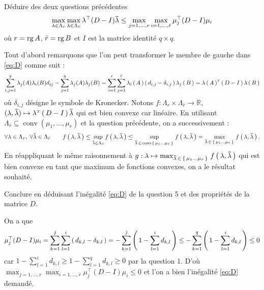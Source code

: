 \begin{qst}

 Déduire des deux questions précédentes
 $$
  \max _ { \lambda \in \Lambda _ { r } } \max _ { \lambda \in \Lambda _ {
    \bar{r} } } \lambda ^ { \top } ( D - I ) \mathbf{\mathbf{\bar{\text{$\lambda$}}}} \leq \max _ { j = 1 , \ldots ,
   r } \max _ { i = 1 , \ldots , \bar{r} } \mu _ { j } ^ { \top } ( D - I )
  \mu _ { i }
 $$
 où $r = \operatorname{rg}{A}$, $\bar{r} = \operatorname{rg}{B}$ et $I$ est la matrice identité $q\times q$.
\end{qst}

\begin{rep}
 Tout d'abord remarquons que l'on peut transformer le membre de gauche dans
 \eqref{eq:D} comme suit :
 $$\sum _ { i , j = 1 } ^ { q } \lambda _ { j } ( A ) \lambda _ { i } ( B )
  d _ { i j } - \sum _ { j = 1 } ^ { q } \lambda _ { j } ( A ) \lambda _ { j } ( B )
  = \sum _ { i = 1 } ^ { r } \sum _ { j = 1 } ^ { \bar{r} } \lambda_i\left( \, A \, \right) \left( \, d_{i,j}-\delta_{i,j} \, \right) \lambda_j\left( \, B \, \right) = \lambda\left( \, A \, \right)^{\scriptscriptstyle T} \left( \, D-I \, \right) \lambda \left( \, B \, \right)$$
 où $\delta_{i,j}$ désigne le symbole de Kronecker. Notons $f : \Lambda_r\times \Lambda_{\bar{r}} \rightarrow \mathbb { R }$, $(\lambda, \mathbf{\mathbf{\bar{\text{$\lambda$}}}})
  \mapsto \lambda^{\scriptscriptstyle T} \left( \, D-I \, \right) \mathbf{\mathbf{\bar{\text{$\lambda$}}}}$ qui est bien convexe car linéaire.
 En utilisant $ \displaystyle \Lambda _ { \bar{r} } \subseteq \operatorname { conv }
  \left( \mu _ { 1 } , \ldots , \mu _ { \bar{r} } \right)$ et la question précédente, on a successivement :
 $$\forall \lambda \in \Lambda_r,\; \forall \mathbf{\mathbf{\bar{\text{$\lambda$}}}} \in \Lambda_{\bar{r}} \qquad f\left( \, \lambda, \mathbf{\mathbf{\bar{\text{$\lambda$}}}} \, \right) \leq
  \sup_{\mathbf{\mathbf{\bar{\text{$\lambda$}}}} \in \Lambda_{\bar{r}}} f\left( \, \lambda, \mathbf{\mathbf{\bar{\text{$\lambda$}}}} \, \right) \leq \sup_{\mathbf{\mathbf{\bar{\text{$\lambda$}}}} \, \in \, \operatorname{conv} \left \{ \, \mu_1 \ldots \mu_{\bar{r}} \, \right \}\, } f\left( \, \lambda, \mathbf{\mathbf{\bar{\text{$\lambda$}}}} \, \right) = \max_{\mathbf{\mathbf{\bar{\text{$\lambda$}}}} \,\in \,\left \{ \, \mu_1 \ldots \mu_{\bar{r}} \, \right \}\,} f\left( \, \lambda, \mathbf{\mathbf{\bar{\text{$\lambda$}}}} \, \right)
  .$$
 En réappliquant le même raisonnement à $g: \lambda \mapsto \max_{\mathbf{\mathbf{\bar{\text{$\lambda$}}}} \,\in \,\left \{ \, \mu_1 \ldots \mu_{\bar{r}} \, \right \}\,} f\left( \, \lambda, \mathbf{\mathbf{\bar{\text{$\lambda$}}}} \, \right)$ qui est bien convexe
 en tant que maximum de fonctions convexes, on a le résultat souhaité.
\end{rep}

\begin{qst}

 Conclure en déduisant l'inégalité \eqref{eq:D} de la question 5 et des propriétés
 de la matrice $D$.
\end{qst}

\begin{rep}

 On a que
 $$\mu _ {j} ^ {\top} ( D - I )\mu _ {i} = \sum_{k = 1}^j \sum_{l=1}^i \left( \, d_{k,l} - \delta_{k,l} \, \right) = -\sum_{k = 1}^j \left( \, 1-\sum_{l=1}^i d_{k,l} \, \right)
  \leq -\sum_{k = 1}^q \left( \, 1-\sum_{l=1}^i d_{k,l} \, \right) \leq 0$$
 car $1 - \sum_{l=1}^i d_{k,l} \geq 1 - \sum_{l=1}^q d_{k,l} \geq 0$ par la question 1. D'où
 $\displaystyle \max _ { j = 1 , \ldots ,
   r } \max _ { i = 1 , \ldots , \bar{r} } \mu _ { j } ^ { \top } ( D - I )
  \mu _ { i } \leq 0$ et l'on a bien l'inégalité \eqref{eq:D} demandé.
\end{rep}


